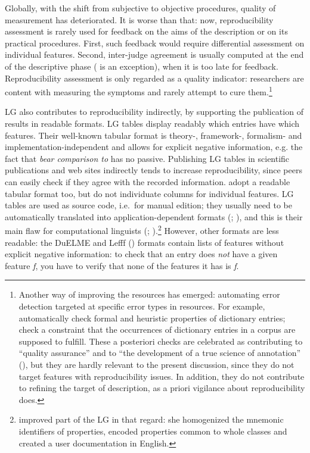 \documentclass[output=paper]{langsci/langscibook}
\begin{document}
Globally, with the shift from subjective to objective procedures, quality of measurement has deteriorated. It is worse than that: now, reproducibility assessment is rarely used for feedback on the aims of the description or on its practical procedures. First, such feedback would require differential assessment on individual features. Second, inter-judge agreement is usually computed at the end of the descriptive phase (\cite[803]{Meyers} is an exception), when it is too late for feedback. Reproducibility assessment is only regarded as a quality indicator: researchers are content with measuring the symptoms and rarely attempt to cure them.\footnote{Another way of improving the resources has emerged: automating error detection targeted at specific error types in resources. 
For example, \citet{Meyers} automatically check formal and heuristic properties of dictionary entries; \citet{Cohen}  check a constraint that the occurrences of dictionary entries in a corpus are supposed to fulfill. These a posteriori checks are celebrated as contributing to “quality assurance” and to “the development of a true science of annotation” (\citealt[82]{Cohen}), but they are hardly relevant to the present discussion, since they do not target features with reproducibility issues. In addition, they do not contribute to refining the target of description, as a priori vigilance about reproducibility does.}

\newpage 
LG  also contributes to reproducibility indirectly, by supporting the publication of results in readable formats. LG tables display readably which entries have which features. Their well-known tabular format is theory-, framework-, formalism- and implementation-independent and allows for explicit negative information, e.g. the fact that \textit{bear comparison to} has no passive. Publishing LG tables in scientific publications and web sites indirectly tends to increase reproducibility, since peers can easily check if they agree with the recorded information.  \citet{Kaalep2008} adopt a readable tabular format too, but do not individuate columns for individual features. LG tables are used as source code, i.e.~for manual edition; they usually need to be automatically translated into application-dependent formats (\citealt{Tolonea}; \citealt{Constanta}), and this is their main flaw for computational linguists (\citealt{Hathout1998}; \citealt{Gardent2005}).\footnote{\citet{Tolone2011} improved part of the LG in that regard: she homogenized the mnemonic identifiers of properties, encoded properties common to whole classes and created a user documentation in English.} However, other formats are less readable: the DuELME \cite[34–36]{Gregoire2010}  and Lefff (\citealt{Tolonea}) formats contain lists of features without explicit negative information: to check that an entry does \textit{not} have a given feature \textit{f}, you have to verify that none of the features it has is \textit{f}.
\end{document}
